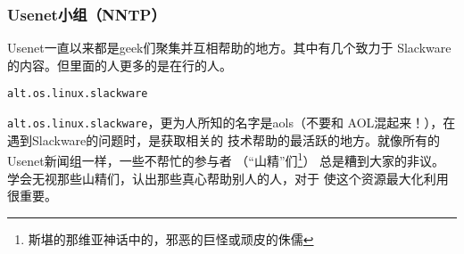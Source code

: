 \subsubsection{Usenet小组（NNTP）}
\label{sec:help:onlineHelp:nonOffice:usenet}

Usenet一直以来都是geek们聚集并互相帮助的地方。其中有几个致力于
Slackware的内容。但里面的人更多的是在行的人。
\begin{verbatim}
alt.os.linux.slackware
\end{verbatim}
\texttt{alt.os.linux.slackware}，更为人所知的名字是aols（不要和
AOL\textregistered{}混起来！），在遇到Slackware的问题时，是获取相关的
技术帮助的最活跃的地方。就像所有的Usenet新闻组一样，一些不帮忙的参与者
（``山精''们\footnote{斯堪的那维亚神话中的，邪恶的巨怪或顽皮的侏儒}）
总是糟到大家的非议。学会无视那些山精们，认出那些真心帮助别人的人，对于
使这个资源最大化利用很重要。


